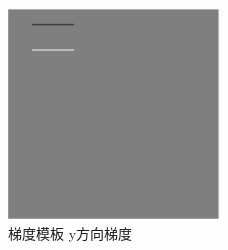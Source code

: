 \begin{figure}[h!]
\center
\includegraphics[width=0.5\textwidth]{figure/gradtest/py1}
\caption{梯度模板 y方向梯度}\label{fig:py1}
\end{figure}

\FloatBarrier
